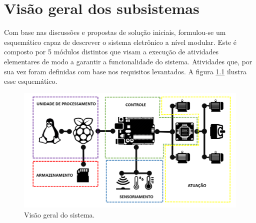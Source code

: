 \chapter{Visão geral dos subsistemas}

%
%

Com base nas discussões e propostas de solução iniciais,
formulou-se um esquemático capaz de descrever o sistema
eletrônico a nível modular. Este é composto por 5 módulos
distintos que visam a execução de atividades elementares
de modo a garantir a funcionalidade do sistema.
Atividades que, por sua vez foram definidas com base nos
requisitos levantados. A figura \ref{fig:visao_geral} ilustra esse esquemático.

\begin{figure}[!htbp]
\begin{center}
\includegraphics[width=.8\textwidth]{figuras/visao_geral.jpg}
\caption{\label{fig:visao_geral}Visão geral do sistema.}
\end{center}
\end{figure}

